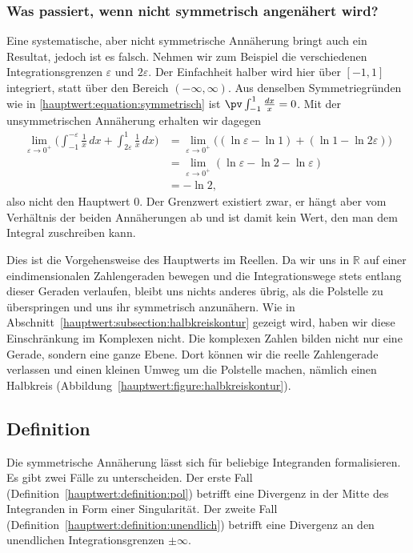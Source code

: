 \subsubsection{Was passiert, wenn nicht symmetrisch angenähert wird?}
Eine systematische, aber nicht symmetrische Annäherung bringt auch ein
Resultat, jedoch ist es falsch. Nehmen wir zum Beispiel die verschiedenen
Integrationsgrenzen $\varepsilon$ und $2\varepsilon$. Der Einfachheit halber
wird hier über $[-1, 1]$ integriert, statt über den Bereich $(-\infty, \infty)$.
Aus denselben Symmetriegründen wie in
\eqref{hauptwert:equation:symmetrisch} ist $\pv\int_{-1}^{1} \frac{dx}{x} = 0$.
Mit der unsymmetrischen Annäherung erhalten wir dagegen
\begin{equation}
  \begin{aligned}
    \lim_{\varepsilon \to 0^+}
    \biggl(
    \int_{-1}^{-\varepsilon} \frac{1}{x}\,dx + \int_{2\varepsilon}^{1} \frac{1}{x}\,dx
    \biggr)
    &= \lim_{\varepsilon \to 0^+}
       \bigl((\ln\varepsilon - \ln 1) + (\ln 1 - \ln 2\varepsilon)\bigr) \\
    &= \lim_{\varepsilon \to 0^+} (\ln\varepsilon - \ln 2 - \ln\varepsilon) \\
    &= -\ln 2,
  \end{aligned}
\end{equation}
also nicht den Hauptwert $0$.
Der Grenzwert existiert zwar, er hängt aber vom Verhältnis der beiden
Annäherungen ab und ist damit kein Wert, den man dem Integral zuschreiben kann.

Dies ist die Vorgehensweise des Hauptwerts im Reellen.
Da wir uns in $\mathbb{R}$ auf einer eindimensionalen Zahlengeraden bewegen
und die Integrationswege stets entlang dieser Geraden verlaufen,
bleibt uns nichts anderes übrig, als die Polstelle zu überspringen
und uns ihr symmetrisch anzunähern.
Wie in Abschnitt~\ref{hauptwert:subsection:halbkreiskontur} gezeigt wird,
haben wir diese Einschränkung im Komplexen nicht.
Die komplexen Zahlen bilden nicht nur eine Gerade, sondern eine ganze Ebene.
Dort können wir die reelle Zahlengerade verlassen und einen kleinen Umweg
um die Polstelle machen, nämlich einen Halbkreis
(Abbildung~\ref{hauptwert:figure:halbkreiskontur}).

\subsection{Definition}
Die symmetrische Annäherung lässt sich für beliebige Integranden
formalisieren.
Es gibt zwei Fälle zu unterscheiden. Der erste Fall
(Definition~\ref{hauptwert:definition:pol}) betrifft eine
Divergenz in der Mitte des Integranden in Form einer Singularität.
Der zweite Fall (Definition~\ref{hauptwert:definition:unendlich}) betrifft eine
Divergenz an den unendlichen Integrationsgrenzen $\pm\infty$.

